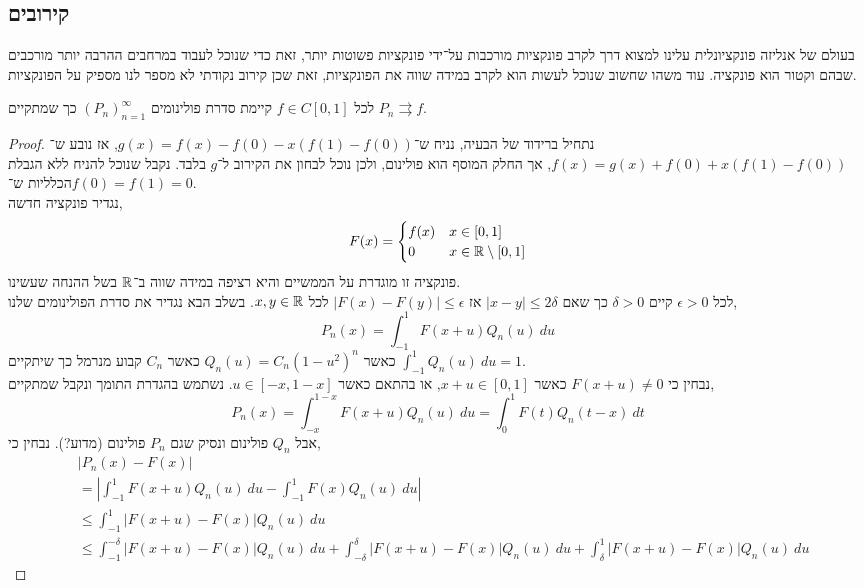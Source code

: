 \subsection{קירובים}
בעולם של אנליזה פונקציונלית עלינו למצוא דרך לקרב פונקציות מורכבות על־ידי פונקציות פשוטות יותר, זאת כדי שנוכל לעבוד במרחבים ההרבה יותר מורכבים שבהם וקטור הוא פונקציה.
עוד משהו שחשוב שנוכל לעשות הוא לקרב במידה שווה את הפונקציות, זאת שכן קירוב נקודתי לא מספר לנו מספיק על הפונקציות.
\begin{theorem}
	לכל $f \in C[0, 1]$ קיימת סדרת פולינומים ${(P_n)}_{n = 1}^\infty$ כך שמתקיים $P_n \rightrightarrows f$.
\end{theorem}
\begin{proof}
	נתחיל ברידוד של הבעיה, נניח ש־$g(x) = f(x) - f(0) - x(f(1) - f(0))$, אז נובע ש־$f(x) = g(x) + f(0) + x(f(1) - f(0))$, אך החלק המוסף הוא פולינום, ולכן נוכל לבחון את הקירוב ל־$g$ בלבד.
	נקבל שנוכל להניח ללא הגבלת הכלליות ש־$f(0) = f(1) = 0$. \\
	נגדיר פונקציה חדשה,
	\[
		F(x)
		= \begin{cases}
			f(x) & x \in [0, 1] \\
			0 & x \in \mathbb{R} \setminus [0, 1]
		\end{cases}
	\] 
	פונקציה זו מוגדרת על הממשיים והיא רציפה במידה שווה ב־$\mathbb{R}$ בשל ההנחה שעשינו. \\
	לכל $\epsilon > 0$ קיים $\delta > 0$ כך שאם $|x - y| \le 2 \delta$ אז $|F(x) - F(y)| \le \epsilon$ לכל $x, y \in \mathbb{R}$.
	בשלב הבא נגדיר את סדרת הפולינומים שלנו,
	\[
		P_n(x)
		= \int_{-1}^{1} F(x + u) Q_n(u)\ du
	\]
	כאשר $Q_n(u) = C_n {(1 - u^2)}^n$ כאשר $C_n$ קבוע מנרמל כך שיתקיים $\int_{-1}^{1} Q_n(u)\ du = 1$. \\
	נבחין כי $F(x + u) \ne 0$ כאשר $x + u \in [0, 1]$, או בהתאם כאשר $u \in [-x, 1 - x]$.
	נשתמש בהגדרת התומך ונקבל שמתקיים,
	\[
		P_n(x)
		= \int_{-x}^{1 - x} F(x + u) Q_n(u)\ du
		= \int_0^1 F(t) Q_n(t - x)\ dt
	\]
	אבל $Q_n$ פולינום ונסיק שגם $P_n$ פולינום (מדוע?).
	נבחין כי,
	\begin{align*}
		& |P_n(x) - F(x)| \\
		& = \left\lvert \int_{-1}^{1} F(x + u) Q_n(u)\ du - \int_{-1}^{1} F(x) Q_n(u)\ du \right\rvert \\
		& \le \int_{-1}^{1} |F(x + u) - F(x)| Q_n(u)\ du \\
		& \le \int_{-1}^{-\delta} |F(x + u) - F(x)| Q_n(u)\ du + \int_{-\delta}^{\delta} |F(x + u) - F(x)| Q_n(u)\ du + \int_{\delta}^1 |F(x + u) - F(x)| Q_n(u)\ du
	\end{align*}

\end{proof}
